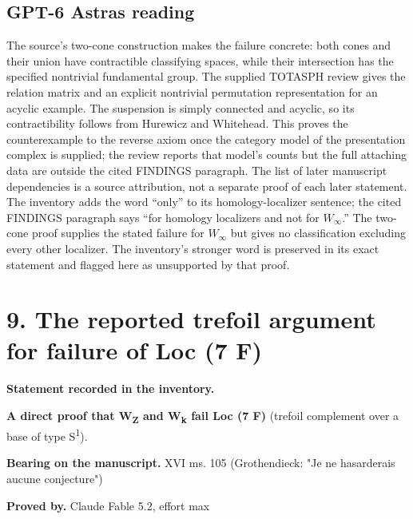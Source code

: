 \subsection*{GPT-6 Astra\textquotesingle s reading}

The source's two-cone construction makes the failure concrete: both cones and their union have contractible classifying spaces, while their intersection has the specified nontrivial fundamental group. The supplied TOTASPH review gives the relation matrix and an explicit nontrivial permutation representation for an acyclic example. The suspension is simply connected and acyclic, so its contractibility follows from Hurewicz and Whitehead. This proves the counterexample to the reverse axiom once the category model of the presentation complex is supplied; the review reports that model's counts but the full attaching data are outside the cited FINDINGS paragraph. The list of later manuscript dependencies is a source attribution, not a separate proof of each later statement. The inventory adds the word ``only'' to its homology-localizer sentence; the cited FINDINGS paragraph says ``for homology localizers and not for $W_\infty$.'' The two-cone proof supplies the stated failure for $W_\infty$ but gives no classification excluding every other localizer. The inventory's stronger word is preserved in its exact statement and flagged here as unsupported by that proof.

\par\bigskip

\section*{9. The reported trefoil argument for failure of Loc (7 F)}


\label{nr:entry9}

\noindent\textbf{Statement recorded in the inventory.}\par\smallskip

\textbf{A direct proof that W\textsubscript{Z} and W\textsubscript{k} fail Loc (7 F)} (trefoil complement over a base of type S\textsuperscript{1}).


\noindent\textbf{Bearing on the manuscript.} XVI ms. 105 (Grothendieck: "Je ne hasarderais aucune conjecture")\par\smallskip

\noindent\textbf{Proved by.} Claude Fable 5.2, effort max\par

